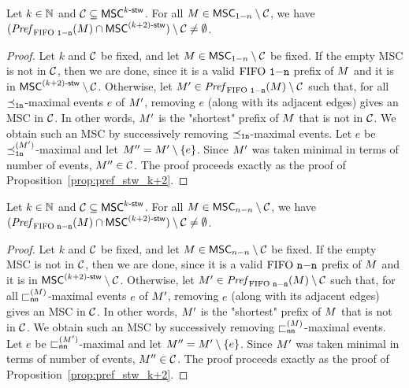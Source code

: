 \begin{proposition}\label{prop:onen_pref_stw_k+2}
	Let $k \in \mathbb{N}$ and $\mathcal{C} \subseteq \mathsf{MSC}^{k\textup{-}\mathsf{stw}}$. For all
	$M \in \mathsf{MSC}_{1\mathsf{-}n} \setminus \mathcal{C}$, we have
	$(\mathit{Pref}_{\text{FIFO } \mathtt{1\mathsf{-}n}}(M) \cap \mathsf{MSC}^{(k+2)\textup{-}\mathsf{stw}}) \setminus \mathcal{C} \neq \emptyset$.
\end{proposition}
\begin{proof}
	Let $k$ and $\mathcal{C}$ be fixed, and let
	$M\in \mathsf{MSC}_{1\mathsf{-}n} \setminus \mathcal{C}$ be fixed. If the empty MSC is not in $\mathcal{C}$, then we are done, since it is a valid $\text{FIFO } \mathtt{1\mathsf{-}n}$ prefix of $M$ and it is in $\mathsf{MSC}^{(k+2)\textup{-}\mathsf{stw}} \setminus \mathcal{C}$.
	Otherwise, let $M'\in \mathit{Pref}_{\text{FIFO } \mathtt{1\mathsf{-}n}}(M) \setminus \mathcal{C}$ such that, for all $\preceq_{\mathtt{1n}}$-maximal events $e$ of $M'$, removing $e$ (along with its adjacent edges) gives an MSC in $\mathcal{C}$. In other words, $M'$ is the "shortest" prefix of $M$ that is not in $\mathcal{C}$. We obtain such an MSC by successively removing $\preceq_{\mathtt{1n}}$-maximal events. Let $e$ be $\preceq_{\mathtt{1n}}^{(M')}$-maximal and let $M''=M' \setminus \{e\}$. Since $M'$ was taken minimal in terms of number of events,	$M''\in \mathcal{C}$.
	The proof proceeds exactly as the proof of Proposition~\ref{prop:pref_stw_k+2}. 
\end{proof}

\begin{proposition}\label{prop:nn_pref_stw_k+2}
	Let $k \in \mathbb{N}$ and $\mathcal{C} \subseteq \mathsf{MSC}^{k\textup{-}\mathsf{stw}}$. For all
	$M \in \mathsf{MSC}_{n\mathsf{-}n} \setminus \mathcal{C}$, we have
	$(\mathit{Pref}_{\text{FIFO } \mathtt{n\mathsf{-}n}}(M) \cap \mathsf{MSC}^{(k+2)\textup{-}\mathsf{stw}}) \setminus \mathcal{C} \neq \emptyset$.
\end{proposition}
\begin{proof}
	Let $k$ and $\mathcal{C}$ be fixed, and let
	$M\in \mathsf{MSC}_{n\mathsf{-}n} \setminus \mathcal{C}$ be fixed. If the empty MSC is not in $\mathcal{C}$, then we are done, since it is a valid $\text{FIFO } \mathtt{n\mathsf{-}n}$ prefix of $M$ and it is in $\mathsf{MSC}^{(k+2)\textup{-}\mathsf{stw}} \setminus \mathcal{C}$.
	Otherwise, let $M'\in \mathit{Pref}_{\text{FIFO } \mathtt{n\mathsf{-}n}}(M) \setminus \mathcal{C}$ such that, for all $\sqsubset_{\mathsf{nn}}^{(M)}$-maximal events $e$ of $M'$, removing $e$ (along with its adjacent edges) gives an MSC in $\mathcal{C}$. In other words, $M'$ is the "shortest" prefix of $M$ that is not in $\mathcal{C}$. We obtain such an MSC by successively removing $\sqsubset_{\mathsf{nn}}^{(M)}$-maximal events. Let $e$ be $\sqsubset_{\mathsf{nn}}^{(M')}$-maximal and let $M''=M' \setminus \{e\}$. Since $M'$ was taken minimal in terms of number of events,	$M''\in \mathcal{C}$.
	The proof proceeds exactly as the proof of Proposition~\ref{prop:pref_stw_k+2}. 
\end{proof}

